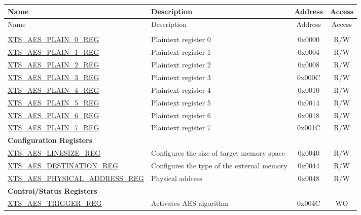 

\begin{longtable}{ | p{6.0cm} | p{6.6cm} | c | c| }
\hline\rowcolor{lightgray}
 Name &  Description & Address & Access \\ \hline
\endfirsthead
\hline
\rowcolor{lightgray}
 Name &  Description & Address & Access  \\
\hline
\endhead
\endfoot

\multicolumn{4}{|l|}{\textbf{Plaintext Register Heap}} \\\hline
\hyperref[regdesc:XTSAESPLAINNREG]{XTS\_AES\_PLAIN\_0\_REG}  & Plaintext register 0   & 0x0000 & R/W \\\hline
\hyperref[regdesc:XTSAESPLAINNREG]{XTS\_AES\_PLAIN\_1\_REG}  & Plaintext register 1   & 0x0004 & R/W \\\hline
\hyperref[regdesc:XTSAESPLAINNREG]{XTS\_AES\_PLAIN\_2\_REG}  & Plaintext register 2   & 0x0008 & R/W \\\hline
\hyperref[regdesc:XTSAESPLAINNREG]{XTS\_AES\_PLAIN\_3\_REG}  & Plaintext register 3   & 0x000C & R/W \\\hline
\hyperref[regdesc:XTSAESPLAINNREG]{XTS\_AES\_PLAIN\_4\_REG}  & Plaintext register 4   & 0x0010 & R/W \\\hline
\hyperref[regdesc:XTSAESPLAINNREG]{XTS\_AES\_PLAIN\_5\_REG}  & Plaintext register 5   & 0x0014 & R/W \\\hline
\hyperref[regdesc:XTSAESPLAINNREG]{XTS\_AES\_PLAIN\_6\_REG}  & Plaintext register 6   & 0x0018 & R/W \\\hline
\hyperref[regdesc:XTSAESPLAINNREG]{XTS\_AES\_PLAIN\_7\_REG}  & Plaintext register 7   & 0x001C & R/W \\\hline
\multicolumn{4}{|l|}{\textbf{Configuration Registers}} \\ \hline
\hyperref[regdesc:XTSAESLINESIZEREG]       {XTS\_AES\_LINESIZE\_REG         }  & Configures the size of target memory space & 0x0040 & R/W \\\hline
\hyperref[regdesc:XTSAESDESTINATIONREG]    {XTS\_AES\_DESTINATION\_REG      }  & Configures the type of the external memory   & 0x0044 & R/W \\\hline
\hyperref[regdesc:XTSAESPHYSICALADDRESSREG]{XTS\_AES\_PHYSICAL\_ADDRESS\_REG}  & Physical address   & 0x0048 & R/W \\\hline
\multicolumn{4}{|l|}{\textbf{Control/Status Registers}} \\ \hline
\hyperref[regdesc:XTSAESTRIGGERREG]        {XTS\_AES\_TRIGGER\_REG          }  & Activates AES algorithm         & 0x004C & WO \\\hline

\end{longtable}
